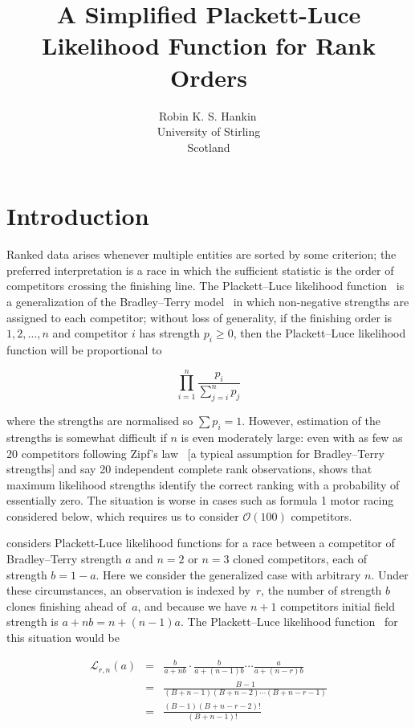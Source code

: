 \documentclass[article]{ajs}
\author{Robin K. S. Hankin\,\orcidlink{0000-0001-5982-0415}\\
  University of Stirling\\ Scotland}
\title{A Simplified Plackett-Luce Likelihood Function for Rank Orders}
\begin{document}

\section{Introduction}

Ranked data arises whenever multiple entities are sorted by some
criterion; the preferred interpretation is a race in which the
sufficient statistic is the order of competitors crossing the
finishing line.  The Plackett--Luce likelihood
function~\cite{luce1959,plackett1975} is a generalization of the
Bradley--Terry model~\cite{bradley1952} in which non-negative strengths
are assigned to each competitor; without loss of generality, if the
finishing order is $1,2,\ldots,n$ and competitor $i$ has strength
$p_i\geqslant 0$, then the Plackett--Luce likelihood function will be
proportional to

\begin{equation}\label{plackettluce}
\prod_{i=1}^n\frac{p_i}{\sum_{j=i}^np_j}
\end{equation}

\noindent where the strengths are normalised so $\sum p_i=1$.
However, estimation of the strengths is somewhat difficult if $n$ is
even moderately large: even with as few as 20 competitors following
Zipf's law~\cite{zipf1949} [a typical assumption for Bradley--Terry
  strengths] and say 20 independent complete rank observations,
\cite{hankin2017_rmd} shows that maximum likelihood strengths
identify the correct ranking with a probability of essentially zero.
The situation is worse in cases such as formula 1 motor racing
considered below, which requires us to consider ${\mathcal O}(100)$
competitors.

\cite{hankin2024_hyper3} considers Plackett-Luce likelihood functions
for a race between a competitor of Bradley--Terry strength $a$ and
$n=2$ or $n=3$ cloned competitors, each of strength $b=1-a$.  Here we
consider the generalized case with arbitrary $n$.  Under these
circumstances, an observation is indexed by~$r$, the number of
strength $b$ clones finishing ahead of~$a$, and because we have $n+1$
competitors %
initial field strength is $a+nb=n+(n-1)a$.  The Plackett--Luce
likelihood function~\citep{luce1959,plackett1975} for this situation
would be

\begin{eqnarray}\label{likeforrn1}
  \mathcal{L}_{r,n}(a) &=&
\frac{b}{a+ n   b}\cdot
\frac{b}{a+(n-1)b}\cdots\frac{a}{a+(n-r)b}\nonumber\\
&=& \frac{B-1}{(B+n-1)(B+n-2)\cdots(B+n-r-1)}\nonumber\\ 
&=& \frac{(B-1)(B+n-r-2)!}{(B+n-1)!}\label{likeforrn3}
\end{eqnarray}
\end{document}
